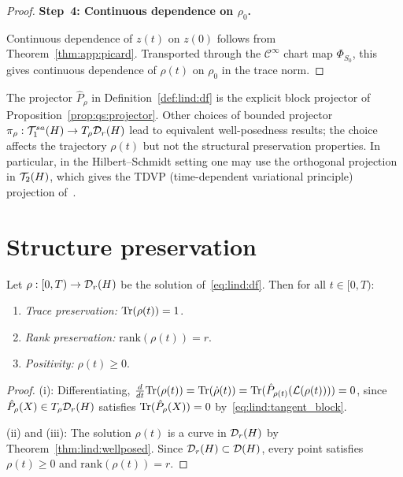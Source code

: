 \begin{proof}
\medskip
\noindent\textbf{Step~4: Continuous dependence on $\rho_0$.}

Continuous dependence of $z(t)$ on $z(0)$ follows from Theorem~\ref{thm:app:picard}.
Transported through the $\mathcal{C}^\infty$ chart map $\Phi_{S_0}$,
this gives continuous dependence of $\rho(t)$ on $\rho_0$ in the
trace norm.
\end{proof}

\begin{remark}
\label{rem:lind:projector_choice}
The projector $\hat{P}_\rho$ in Definition~\ref{def:lind:df} is the
explicit block projector of Proposition~\ref{prop:qs:projector}. Other
choices of bounded projector $\pi_\rho: \mathcal{T}_{1}^{sa}(H) \to T_\rho
\mathcal{D}_{r}(H)$ lead to equivalent well-posedness results; the choice
affects the trajectory $\rho(t)$ but not the structural preservation
properties. In particular, in the Hilbert--Schmidt setting one may use
the orthogonal projection in $\mathcal{T}_{2}(H)$, which gives the TDVP
(time-dependent variational principle) projection of~\cite{LeBrisRouchon2013}.
\end{remark}

\section{Structure preservation}
\label{sec:lind:preservation}

\begin{proposition}
\label{prop:lind:preservation}
Let $\rho: [0,T) \to \mathcal{D}_{r}(H)$ be the solution of~\eqref{eq:lind:df}.
Then for all $t \in [0, T)$:
\begin{enumerate}
\item[\textup{(i)}] \emph{Trace preservation:}
    $\mathrm{Tr}(\rho(t)) = 1$.
\item[\textup{(ii)}] \emph{Rank preservation:}
    $\mathrm{rank}(\rho(t)) = r$.
\item[\textup{(iii)}] \emph{Positivity:}
    $\rho(t) \geq 0$.
\end{enumerate}
\end{proposition}

\begin{proof}
\textup{(i)}: Differentiating, $\frac{d}{dt}\mathrm{Tr}(\rho(t)) =
\mathrm{Tr}(\dot\rho(t)) = \mathrm{Tr}(\hat{P}_{\rho(t)}(\mathcal{L}(\rho(t)))) = 0$,
since $\hat{P}_\rho(X) \in T_\rho \mathcal{D}_{r}(H)$ satisfies
$\mathrm{Tr}(\hat{P}_\rho(X)) = 0$ by~\eqref{eq:lind:tangent_block}.

\textup{(ii)} and \textup{(iii)}: The solution $\rho(t)$ is a curve
in $\mathcal{D}_{r}(H)$ by Theorem~\ref{thm:lind:wellposed}. Since
$\mathcal{D}_{r}(H) \subset \mathcal{D}(H)$, every point satisfies
$\rho(t) \geq 0$ and $\mathrm{rank}(\rho(t)) = r$.
\end{proof}

